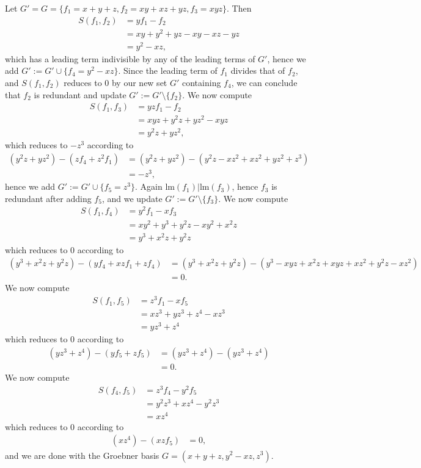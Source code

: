 \documentclass{article}
\theoremstyle{definition}
\newcommand{\lm}{\text{lm}}
\begin{document}
Let $G' = G = \{ f_1 = x + y + z, f_2 = xy + xz + yz, f_3 = xyz \}$.
Then 
\begin{align*}
	S(f_1, f_2)
	&=
	yf_1 - f_2 \\
	&=
	xy + y^2 + yz - xy - xz - yz \\
	&=
	y^2 - xz,
\end{align*}
which has a leading term indivisible by any of the leading terms of $G'$, hence
we add $G' := G' \cup \{ f_4 = y^2 - xz \}$. Since the leading term of $f_1$
divides that of $f_2$, and $S(f_1, f_2)$ reduces to $0$ by our new set $G'$
containing $f_4$, we can conclude that $f_2$ is redundant and update $G' := G'
\setminus \{ f_2 \}$.
We now compute
\begin{align*}
	S(f_1, f_3)
	&=
	yzf_1 - f_2 \\
	&=
	xyz + y^2z + yz^2 - xyz \\
	&=
	y^2z + yz^2,
\end{align*}
which reduces to $-z^3$ according to
\begin{align*}
	(y^2z + yz^2) - (zf_4 + z^2f_1)
	&=
	(y^2z + yz^2) - (y^2z - xz^2 + xz^2 + yz^2 + z^3) \\
	&=
	-z^3,
\end{align*}
hence we add $G' := G' \cup \{ f_5 = z^3 \}$. Again $\lm(f_1) | \lm(f_3)$,
hence $f_3$ is redundant after adding $f_5$, and  we update $G' := G' \setminus
\{ f_3 \}$. We now compute
\begin{align*}
	S(f_1, f_4)
	&=
	y^2f_1 - xf_3 \\
	&=
	xy^2 + y^3 + y^2z - xy^2 + x^2z	\\
	&=
	y^3 + x^2z + y^2z
\end{align*}
which reduces to $0$ according to
\begin{align*}
	(y^3 + x^2z + y^2z) - (yf_4 + xzf_1 + zf_4)
	&=
	(y^3 + x^2z + y^2z) - 
	(y^3 - xyz + x^2z + xyz + xz^2 + y^2z - xz^2) \\
	&=
	0.
\end{align*}
We now compute
\begin{align*}
	S(f_1, f_5)
	&=
	z^3f_1 - xf_5 \\
	&=
	xz^3 + yz^3 + z^4 - xz^3 \\
	&=
	yz^3 + z^4
\end{align*}
which reduces to $0$ according to
\begin{align*}
	(yz^3 + z^4) - (yf_5 + zf_5)
	&=
	(yz^3 + z^4) - (yz^3 + z^4) \\
	&=
	0.
\end{align*}
We now compute
\begin{align*}
	S(f_4, f_5)
	&=
	z^3f_4 - y^2f_5 \\
	&=
	y^2z^3 + xz^4 - y^2z^3 \\
	&=
	xz^4
\end{align*}
which reduces to $0$ according to
\begin{align*}
	(xz^4) - (xzf_5)
	&=
	0,
\end{align*}
and we are done with the Groebner basis $G = (x + y + z, y^2 - xz, z^3)$.
\end{document}
